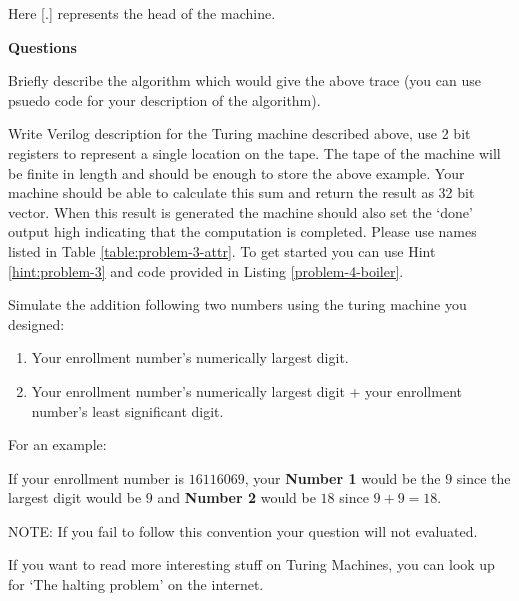 \documentclass[a4paper,10pt]{article}
\theoremstyle{mytheor}
\newcommand{\problemheading}[1] {
  \vspace{0.3cm}

  {
    \setlength{\parindent}{0}
    \textbf{#1}
  }

  \vspace{0.05cm}
}
\begin{document}
{    Here \textsc{[.]} represents the head of the machine.
    
    \problemheading{Questions}
    \begin{legal}
    \item Briefly describe the algorithm which would give the above
      trace (you can use psuedo code for your description of the
      algorithm).
    \item Write Verilog description for the Turing machine described
      above, use 2 bit registers to represent a single location on the
      tape. The tape of the machine will be finite in length and
      should be enough to store the above example. Your machine should
      be able to calculate this sum and return the result as 32 bit
      vector. When this result is generated the machine should also
      set the `done' output high indicating that the computation is
      completed. Please use names listed in Table
      \ref{table:problem-3-attr}. To get started you can use Hint
      \ref{hint:problem-3} and code provided in Listing
      \ref{problem-4-boiler}.
    \item Simulate the addition following two numbers using the turing
      machine you designed:
      \begin{enumerate}
      \item Your enrollment number's numerically largest digit.
      \item Your enrollment number's numerically largest digit + your
        enrollment number's least significant digit.
      \end{enumerate}
      For an example:

      If your enrollment number is $16116069$, your \textbf{Number 1}
      would be the $9$ since the largest digit would be $9$ and
      \textbf{Number 2} would be $18$ since
      $9+9=18$.

      {\color{red}NOTE:} If you fail to follow this convention your
      question will not evaluated.      
    \end{legal}
  If you want to read more interesting stuff on Turing Machines, you
  can look up for `The halting problem' on the internet.

}
\end{document}
